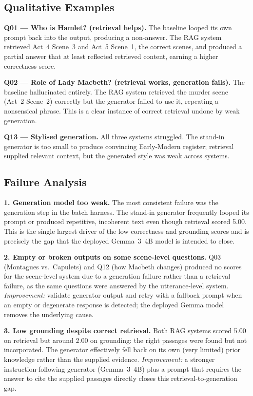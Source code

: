 \subsection{Qualitative Examples}

\textbf{Q01 --- Who is Hamlet? (retrieval helps).} The baseline looped its
own prompt back into the output, producing a non-answer. The RAG system
retrieved Act~4 Scene~3 and Act~5 Scene~1, the correct scenes, and
produced a partial answer that at least reflected retrieved content,
earning a higher correctness score.

\textbf{Q02 --- Role of Lady Macbeth? (retrieval works, generation
fails).} The baseline hallucinated entirely. The RAG system retrieved the
murder scene (Act~2 Scene~2) correctly but the generator failed to use
it, repeating a nonsensical phrase. This is a clear instance of correct
retrieval undone by weak generation.

\textbf{Q13 --- Stylised generation.} All three systems struggled. The
stand-in generator is too small to produce convincing Early-Modern
register; retrieval supplied relevant context, but the generated style
was weak across systems.

\subsection{Failure Analysis}

\textbf{1. Generation model too weak.} The most consistent failure was
the generation step in the batch harness. The stand-in generator
frequently looped its prompt or produced repetitive, incoherent text even
though retrieval scored 5.00. This is the single largest driver of the
low correctness and grounding scores and is precisely the gap that the
deployed Gemma~3~4B model is intended to close.

\textbf{2. Empty or broken outputs on some scene-level questions.} Q03
(Montagues vs.\ Capulets) and Q12 (how Macbeth changes) produced no
scores for the scene-level system due to a generation failure rather than
a retrieval failure, as the same questions were answered by the
utterance-level system. \emph{Improvement:} validate generator output and
retry with a fallback prompt when an empty or degenerate response is
detected; the deployed Gemma model removes the underlying cause.

\textbf{3. Low grounding despite correct retrieval.} Both RAG systems
scored 5.00 on retrieval but around 2.00 on grounding: the right passages
were found but not incorporated. The generator effectively fell back on
its own (very limited) prior knowledge rather than the supplied evidence.
\emph{Improvement:} a stronger instruction-following generator (Gemma~3~4B)
plus a prompt that requires the answer to cite the supplied passages
directly closes this retrieval-to-generation gap.

